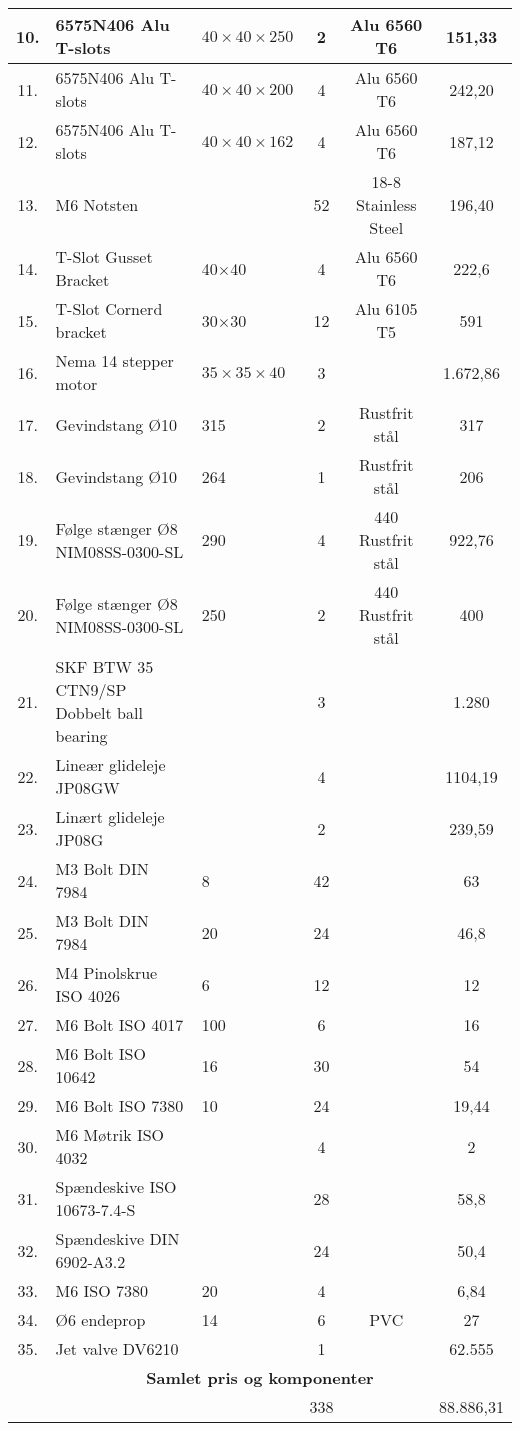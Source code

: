 \begin{longtable}{|c p{4.5cm} p{3cm} c c c|}
 10.& 6575N406 Alu T-slots &  $40\times 40 \times 250$ & 2 & Alu 6560 T6 &  151,33 \\\hline %
 11.& 6575N406 Alu T-slots & $40\times 40 \times 200$ & 4 & Alu 6560 T6 &  242,20 \\\hline %
 12.& 6575N406 Alu T-slots & $40\times 40 \times 162$ & 4 & Alu 6560 T6 & 187,12 \\\hline %
 13.& M6 Notsten &  & 52 & 18-8 Stainless Steel & 196,40 \\\hline %
 14.& T-Slot Gusset Bracket & 40$\times$40 & 4 & Alu 6560 T6 &  222,6 \\\hline %
 15.& T-Slot Cornerd bracket & 30$\times$30 & 12 & Alu 6105 T5 &  591 \\\hline %
 16.& Nema 14 stepper motor & $35 \times 35 \times 40$ & 3 &  & 1.672,86 \\\hline 
 17.& Gevindstang Ø10 & 315 & 2 & Rustfrit stål & 317 \\\hline
 18.& Gevindstang Ø10 & 264 & 1 &  Rustfrit stål & 206 \\\hline
 19.& Følge stænger Ø8 NIM08SS-0300-SL & 290 & 4 & 440 Rustfrit stål & 922,76 \\\hline
 20.& Følge stænger Ø8 NIM08SS-0300-SL & 250 & 2 & 440 Rustfrit stål & 400 \\\hline
 21.& SKF BTW 35 CTN9/SP Dobbelt ball bearing &  & 3 &  & 1.280 \\\hline
 22.& Lineær glideleje JP08GW &  & 4 &  & 1104,19 \\\hline
 23.& Linært glideleje JP08G &  & 2 &  & 239,59 \\\hline
 24.& M3 Bolt DIN 7984 & 8 & 42 &  & 63 \\\hline %
 25.& M3 Bolt DIN 7984 & 20 & 24 &  & 46,8 \\\hline
 26.& M4 Pinolskrue ISO 4026 & 6 & 12 &  & 12 \\\hline
 27.& M6 Bolt ISO 4017 & 100 & 6  &  & 16 \\\hline
 28.& M6 Bolt ISO 10642 & 16  &  30 &  & 54 \\\hline
 29.& M6 Bolt ISO 7380 &  10 & 24 &  & 19,44 \\\hline
 30.& M6 Møtrik ISO 4032 &  & 4 &  & 2 \\\hline
 31.& Spændeskive ISO 10673-7.4-S & & 28 &  & 58,8 \\\hline
 32.& Spændeskive DIN 6902-A3.2 & & 24 &  & 50,4 \\\hline
 33.& M6 ISO 7380 & 20 & 4 &  & 6,84 \\\hline
 34.& Ø6 endeprop & 14 & 6 & PVC & 27 \\\hline 
 35.& Jet valve DV6210 &  & 1 &  & 62.555 \\\hline 
 
 \multicolumn{6}{|c|}{\cellcolor{aaublue} \color{white}\textbf{Samlet pris og komponenter}}  \\\hline

 &  &   & 338 & &  88.886,31 \\\hline

\end{longtable}

